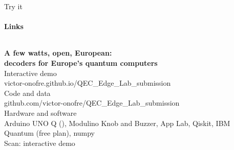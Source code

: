 \documentclass[aspectratio=169,11pt]{beamer}
\newcommand{\eur}{\texteuro}
\newcommand{\hl}[1]{{\color{accent}#1}}
\newcommand{\dimnote}[1]{{\color{dim}\small #1}}
\begin{document}
\begin{frame}{Try it}\framesubtitle{Links}
  \begin{columns}[c]
    {\Large\bfseries A few watts, open, European:\\[0.2em] \hl{decoders for Europe's quantum computers}}\\[1.4em]
    {\small
    \dimnote{Interactive demo}\\ \hl{victor-onofre.github.io/QEC\_Edge\_Lab\_submission}\\[0.6em]
    \dimnote{Code and data}\\ \hl{github.com/victor-onofre/QEC\_Edge\_Lab\_submission}\\[0.6em]
    \dimnote{Hardware and software}\\ Arduino UNO Q (\eur59.90), Modulino Knob and Buzzer, App Lab, Qiskit, IBM Quantum (free plan), numpy}
    \centering
    \colorbox{white}{\color{black}}\\[0.5em]
    \dimnote{Scan: interactive demo}
  \end{columns}
\end{frame}
\end{document}
